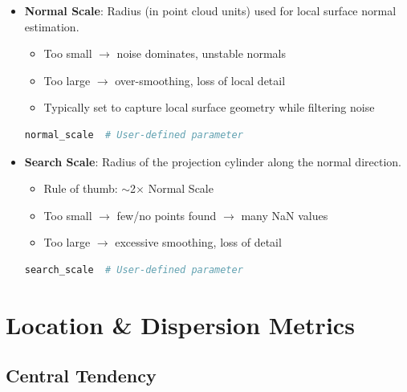 \documentclass[12pt]{article}
\begin{document}
\begin{itemize}
    \item \textbf{Normal Scale}: Radius (in point cloud units) used for local surface normal estimation.
    \begin{itemize}
        \item Too small $\rightarrow$ noise dominates, unstable normals
        \item Too large $\rightarrow$ over-smoothing, loss of local detail
        \item Typically set to capture local surface geometry while filtering noise
    \end{itemize}
    \begin{lstlisting}[language=Python]
normal_scale  # User-defined parameter
    \end{lstlisting}

    \item \textbf{Search Scale}: Radius of the projection cylinder along the normal direction.
    \begin{itemize}
        \item Rule of thumb: $\sim$2$\times$ Normal Scale
        \item Too small $\rightarrow$ few/no points found $\rightarrow$ many NaN values
        \item Too large $\rightarrow$ excessive smoothing, loss of detail
    \end{itemize}
    \begin{lstlisting}[language=Python]
search_scale  # User-defined parameter
    \end{lstlisting}
\end{itemize}

\section{Location \& Dispersion Metrics}

\subsection{Central Tendency}
\end{document}
